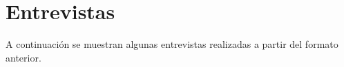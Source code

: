 \chapter{Entrevistas}
\label{cap:Entrevistas}


A continuación se muestran algunas entrevistas realizadas a partir del formato anterior.



